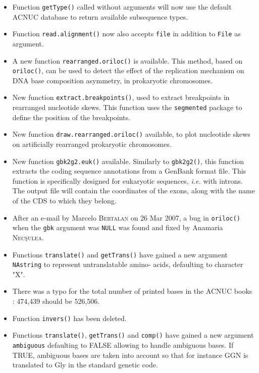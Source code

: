 \documentclass{article}
\begin{document}
\begin{itemize}
\item Function \texttt{getType()} called without arguments will now use
the default ACNUC database to return available subsequence types.

\item Function \texttt{read.alignment()} now also accepts \texttt{file} in
addition to \texttt{File} as argument.

\item A new function \texttt{rearranged.oriloc()} is available. This
method, based on \texttt{oriloc()}, can be used to detect the effect of
the replication mechanism on DNA base composition asymmetry, in
prokaryotic chromosomes.

\item New function \texttt{extract.breakpoints()}, used to extract
breakpoints in rearranged nucleotide skews. This function uses the
\texttt{segmented} package to define the position of the breakpoints.

\item New function \texttt{draw.rearranged.oriloc()} available, to plot
nucleotide skews on artificially rearranged prokaryotic chromosomes.

\item New function \texttt{gbk2g2.euk()} available. Similarly to
\texttt{gbk2g2()}, this function extracts the coding sequence annotations
from a GenBank format file. This function is specifically designed for
eukaryotic sequences, \textit{i.e.} with introns. The output file will contain
the coordinates of the exons, along with the name of the CDS to which
they belong.

\item After an e-mail by Marcelo \textsc{Bertalan} on 26 Mar 2007, a bug in
\texttt{oriloc()} when the \texttt{gbk} argument was \texttt{NULL}
was found and fixed by Anamaria \textsc{Nec\c{s}ulea}.

\item Functions \texttt{translate()} and \texttt{getTrans()} have gained
a new argument \texttt{NAstring} to represent untranslatable amino-
acids, defaulting to character "X".

\item There was a typo for the total number of printed bases in
the ACNUC books \cite{GautierC1982a, GautierC1982b} : 474,439 should be 526,506.

\item Function \texttt{invers()} has been deleted.

\item Functions \texttt{translate()}, \texttt{getTrans()} and \texttt{comp()} have gained a
new argument \texttt{ambiguous} defaulting to FALSE allowing to handle
ambiguous bases. If TRUE, ambiguous bases are taken into account so that
for instance GGN is translated to Gly in the standard genetic code.


\end{itemize}
\end{document}
